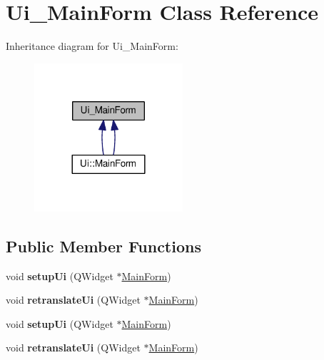 \hypertarget{class_ui___main_form}{}\section{Ui\+\_\+\+Main\+Form Class Reference}
\label{class_ui___main_form}


Inheritance diagram for Ui\+\_\+\+Main\+Form\+:\nopagebreak
\begin{figure}[H]
\begin{center}
\leavevmode
\includegraphics[width=156pt]{class_ui___main_form__inherit__graph}
\end{center}
\end{figure}
\subsection*{Public Member Functions}
\begin{DoxyCompactItemize}
\item 
void {\bfseries setup\+Ui} (Q\+Widget $\ast$\hyperlink{class_main_form}{Main\+Form})\hypertarget{class_ui___main_form_a96cb87a6a510a80d254dc24c17f8ade6}{}\label{class_ui___main_form_a96cb87a6a510a80d254dc24c17f8ade6}

\item 
void {\bfseries retranslate\+Ui} (Q\+Widget $\ast$\hyperlink{class_main_form}{Main\+Form})\hypertarget{class_ui___main_form_a2db2cb834298dc62a03157b2423d035b}{}\label{class_ui___main_form_a2db2cb834298dc62a03157b2423d035b}

\item 
void {\bfseries setup\+Ui} (Q\+Widget $\ast$\hyperlink{class_main_form}{Main\+Form})\hypertarget{class_ui___main_form_a96cb87a6a510a80d254dc24c17f8ade6}{}\label{class_ui___main_form_a96cb87a6a510a80d254dc24c17f8ade6}

\item 
void {\bfseries retranslate\+Ui} (Q\+Widget $\ast$\hyperlink{class_main_form}{Main\+Form})\hypertarget{class_ui___main_form_a2db2cb834298dc62a03157b2423d035b}{}\label{class_ui___main_form_a2db2cb834298dc62a03157b2423d035b}

\end{DoxyCompactItemize}
